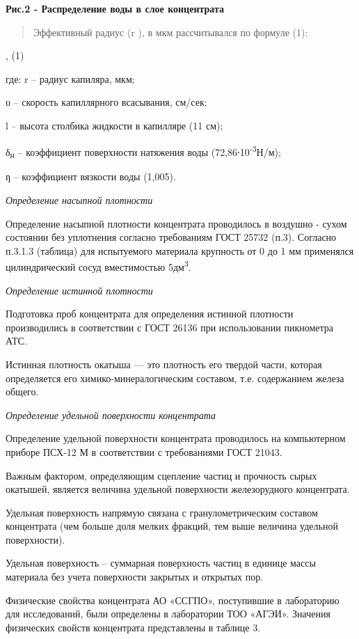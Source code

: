 {\bfseries Рис.2 - Распределение воды в слое концентрата}

\begin{quote}
Эффективный радиус (r ), в мкм рассчитывался по формуле (1):
\end{quote}

,
(1)

где: r -- радиус капиляра, мкм;

υ -- скорость капиллярного всасывания, см/сек;

l -- высота столбика жидкости в капилляре (11 см);

δ\textsubscript{н} -- коэффициент поверхности натяжения воды
(72,86⸱10\textsuperscript{-3}Н/м);

ƞ -- коэффициент вязкости воды (1,005).

\emph{Определение насыпной плотности}

Определение насыпной плотности концентрата проводилось в воздушно -
сухом состоянии без уплотнения согласно требованиям ГОСТ 25732 (п.3).
Согласно п.3.1.3 (таблица) для испытуемого материала крупность от 0 до 1
мм применялся цилиндрический сосуд вместимостью 5дм\textsuperscript{3}.

\emph{Определение истинной плотности}

Подготовка проб концентрата для определения истинной плотности
производились в соответствии с ГОСТ 26136 при использовании пикнометра
АТС.

Истинная плотность окатыша --- это плотность его твердой части, которая
определяется его химико-минералогическим составом, т.е. содержанием
железа общего.

\emph{Определение удельной поверхности концентрата}

Определение удельной поверхности концентрата проводилось на компьютерном
приборе ПСХ-12 М в соответствии с требованиями ГОСТ 21043.

Важным фактором, определяющим сцепление частиц и прочность сырых
окатышей, является величина удельной поверхности железорудного
концентрата.

Удельная поверхность напрямую связана с гранулометрическим составом
концентрата (чем больше доля мелких фракций, тем выше величина удельной
поверхности).

Удельная поверхность -- суммарная поверхность частиц в единице массы
материала без учета поверхности закрытых и открытых пор.

Физические свойства концентрата АО «ССГПО», поступившие в лабораторию
для исследований, были определены в лаборатории ТОО «АГЭИ». Значения
физических свойств концентрата представлены в таблице 3.

